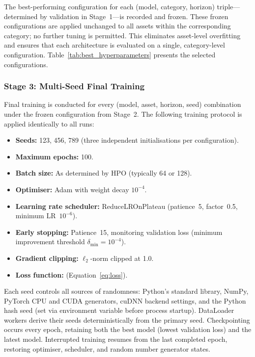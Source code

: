 The best-performing configuration for each (model, category, horizon) triple---determined by validation \mse in Stage~1---is recorded and frozen.  These frozen configurations are applied unchanged to all assets within the corresponding category; no further tuning is permitted.  This eliminates asset-level overfitting and ensures that each architecture is evaluated on a single, category-level configuration.  Table~\ref{tab:best_hyperparameters} presents the selected configurations.



\subsubsection{Stage 3: Multi-Seed Final Training}
\label{sec:stage3_training}

Final training is conducted for every (model, asset, horizon, seed) combination under the frozen configuration from Stage~2.  The following training protocol is applied identically to all runs:

\begin{itemize}[nosep]
  \item \textbf{Seeds:} 123, 456, 789 (three independent initialisations per configuration).
  \item \textbf{Maximum epochs:} 100.
  \item \textbf{Batch size:} As determined by HPO (typically 64 or 128).
  \item \textbf{Optimiser:} Adam with weight decay $10^{-4}$.
  \item \textbf{Learning rate scheduler:} ReduceLROnPlateau (patience~5, factor~0.5, minimum LR~$10^{-6}$).
  \item \textbf{Early stopping:} Patience~15, monitoring validation loss (minimum improvement threshold $\delta_{\min} = 10^{-4}$).
  \item \textbf{Gradient clipping:} $\ell_2$-norm clipped at 1.0.
  \item \textbf{Loss function:} \mse (Equation~\ref{eq:loss}).
\end{itemize}

Each seed controls all sources of randomness: Python's standard library, NumPy, PyTorch CPU and CUDA generators, cuDNN backend settings, and the Python hash seed (set via environment variable before process startup).  DataLoader workers derive their seeds deterministically from the primary seed.  Checkpointing occurs every epoch, retaining both the best model (lowest validation loss) and the latest model.  Interrupted training resumes from the last completed epoch, restoring optimiser, scheduler, and random number generator states.

